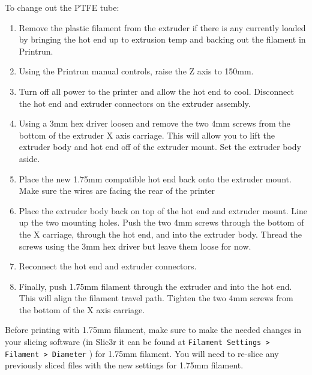 To change out the PTFE tube:
\begin{enumerate}
\item Remove the plastic filament from the extruder if there is any currently loaded by bringing the hot end up to extrusion temp and backing out the filament in Printrun.

\item Using the Printrun manual controls, raise the Z axis to 150mm.
\item Turn off all power to the printer and allow the hot end to cool. Disconnect the hot end and extruder connectors on the extruder assembly.
\item Using a 3mm hex driver loosen and remove the two 4mm screws from the bottom of the extruder X axis carriage. This will allow you to lift the extruder body and hot end off of the extruder mount. Set the extruder body aside.

\item Place the new 1.75mm compatible hot end back onto the extruder mount. Make sure the wires are facing the rear of the printer
\item Place the extruder body back on top of the hot end and extruder mount. Line up the two mounting holes. Push the two 4mm screws through the bottom of the X carriage, through the hot end, and into the extruder body. Thread the screws using the 3mm hex driver but leave them loose for now.
\item Reconnect the hot end and extruder connectors.
\item Finally, push 1.75mm filament through the extruder and into the hot end. This will align the filament travel path. Tighten the two 4mm screws from the bottom of the X axis carriage.
\end{enumerate}

Before printing with 1.75mm filament, make sure to make the needed changes in your slicing software (in Slic3r it can be found at \texttt{Filament Settings > Filament > Diameter} ) for 1.75mm filament. You will need to re-slice any previously sliced files with the new settings for 1.75mm filament.
